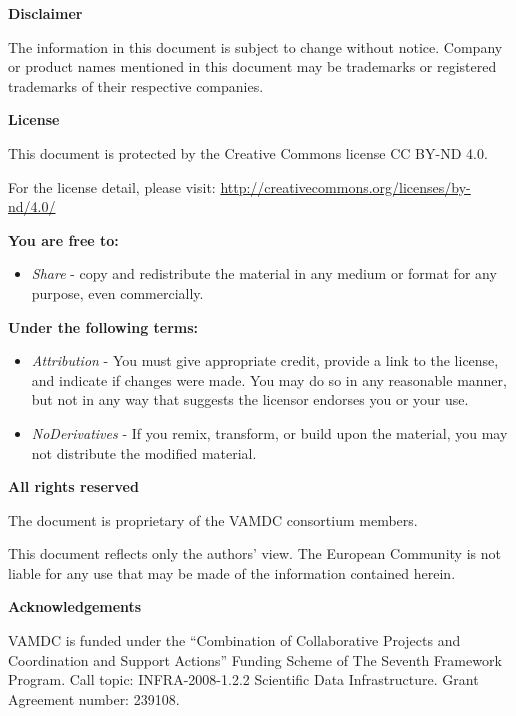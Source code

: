 \noindent \large \textbf{Disclaimer} \normalsize

\noindent The information in this document is subject to change without notice. Company or product names mentioned in this document may be trademarks or registered trademarks of their respective companies.

\noindent \large \textbf{License} \normalsize

This document is protected by the Creative Commons license CC BY-ND 4.0.

For the license detail, please visit: \url{http://creativecommons.org/licenses/by-nd/4.0/}

\textbf{You are free to:}

\begin{itemize} 
\item \textit{Share} - copy and redistribute the material in any medium or format for any purpose, even commercially.
\end{itemize}

\textbf{Under the following terms:}

\begin{itemize}
  \item \textit{Attribution} - You must give appropriate credit, provide a link to the license, and indicate if changes were made. You may do so in any reasonable manner, but not in any way that suggests the licensor endorses you or your use.
  \item \textit{NoDerivatives} - If you remix, transform, or build upon the material, you may not distribute the modified material.
\end{itemize}

\noindent \large \textbf{All rights reserved} \normalsize

\noindent The document is proprietary of the VAMDC consortium members. 

\noindent This document reflects only the authors' view. The European Community is not liable for any use that may be made of the information contained herein.

\noindent \large \textbf{Acknowledgements} \normalsize

\noindent VAMDC is funded under the ``Combination of Collaborative Projects and Coordination and  Support Actions'' Funding Scheme of The Seventh Framework Program. Call topic: INFRA-2008-1.2.2 Scientific Data Infrastructure. Grant Agreement number: 239108.